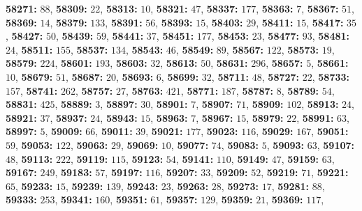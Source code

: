 \textsf{\bfseries 58271:} $88$, \textsf{\bfseries 58309:} $22$, \textsf{\bfseries 58313:} $10$, \textsf{\bfseries 58321:} $47$, \textsf{\bfseries 58337:} $177$, \textsf{\bfseries 58363:} $7$, \textsf{\bfseries 58367:} $51$, \textsf{\bfseries 58369:} $14$, \textsf{\bfseries 58379:} $133$, \textsf{\bfseries 58391:} $56$, \textsf{\bfseries 58393:} $15$, \textsf{\bfseries 58403:} $29$, \textsf{\bfseries 58411:} $15$, \textsf{\bfseries 58417:} $35$, \textsf{\bfseries 58427:} $50$, \textsf{\bfseries 58439:} $59$, \textsf{\bfseries 58441:} $37$, \textsf{\bfseries 58451:} $177$, \textsf{\bfseries 58453:} $23$, \textsf{\bfseries 58477:} $93$, \textsf{\bfseries 58481:} $24$, \textsf{\bfseries 58511:} $155$, \textsf{\bfseries 58537:} $134$, \textsf{\bfseries 58543:} $46$, \textsf{\bfseries 58549:} $89$, \textsf{\bfseries 58567:} $122$, \textsf{\bfseries 58573:} $19$, \textsf{\bfseries 58579:} $224$, \textsf{\bfseries 58601:} $193$, \textsf{\bfseries 58603:} $32$, \textsf{\bfseries 58613:} $50$, \textsf{\bfseries 58631:} $296$, \textsf{\bfseries 58657:} $5$, \textsf{\bfseries 58661:} $10$, \textsf{\bfseries 58679:} $51$, \textsf{\bfseries 58687:} $20$, \textsf{\bfseries 58693:} $6$, \textsf{\bfseries 58699:} $32$, \textsf{\bfseries 58711:} $48$, \textsf{\bfseries 58727:} $22$, \textsf{\bfseries 58733:} $157$, \textsf{\bfseries 58741:} $262$, \textsf{\bfseries 58757:} $27$, \textsf{\bfseries 58763:} $421$, \textsf{\bfseries 58771:} $187$, \textsf{\bfseries 58787:} $8$, \textsf{\bfseries 58789:} $54$, \textsf{\bfseries 58831:} $425$, \textsf{\bfseries 58889:} $3$, \textsf{\bfseries 58897:} $30$, \textsf{\bfseries 58901:} $7$, \textsf{\bfseries 58907:} $71$, \textsf{\bfseries 58909:} $102$, \textsf{\bfseries 58913:} $24$, \textsf{\bfseries 58921:} $37$, \textsf{\bfseries 58937:} $24$, \textsf{\bfseries 58943:} $15$, \textsf{\bfseries 58963:} $7$, \textsf{\bfseries 58967:} $15$, \textsf{\bfseries 58979:} $22$, \textsf{\bfseries 58991:} $63$, \textsf{\bfseries 58997:} $5$, \textsf{\bfseries 59009:} $66$, \textsf{\bfseries 59011:} $39$, \textsf{\bfseries 59021:} $177$, \textsf{\bfseries 59023:} $116$, \textsf{\bfseries 59029:} $167$, \textsf{\bfseries 59051:} $59$, \textsf{\bfseries 59053:} $122$, \textsf{\bfseries 59063:} $29$, \textsf{\bfseries 59069:} $10$, \textsf{\bfseries 59077:} $74$, \textsf{\bfseries 59083:} $5$, \textsf{\bfseries 59093:} $63$, \textsf{\bfseries 59107:} $48$, \textsf{\bfseries 59113:} $222$, \textsf{\bfseries 59119:} $115$, \textsf{\bfseries 59123:} $54$, \textsf{\bfseries 59141:} $110$, \textsf{\bfseries 59149:} $47$, \textsf{\bfseries 59159:} $63$, \textsf{\bfseries 59167:} $249$, \textsf{\bfseries 59183:} $57$, \textsf{\bfseries 59197:} $116$, \textsf{\bfseries 59207:} $33$, \textsf{\bfseries 59209:} $52$, \textsf{\bfseries 59219:} $71$, \textsf{\bfseries 59221:} $65$, \textsf{\bfseries 59233:} $15$, \textsf{\bfseries 59239:} $139$, \textsf{\bfseries 59243:} $23$, \textsf{\bfseries 59263:} $28$, \textsf{\bfseries 59273:} $17$, \textsf{\bfseries 59281:} $88$, \textsf{\bfseries 59333:} $253$, \textsf{\bfseries 59341:} $160$, \textsf{\bfseries 59351:} $61$, \textsf{\bfseries 59357:} $129$, \textsf{\bfseries 59359:} $21$, \textsf{\bfseries 59369:} $117$, 
